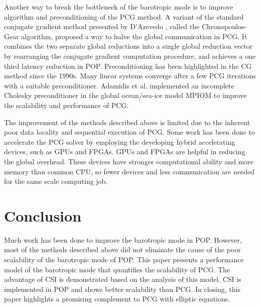\documentclass{sig-alternate}
\begin{document}
Another way to break the bottleneck of the barotropic mode is to improve algorithm and preconditioning of the PCG method.
A variant of the standard conjugate gradient method presented by D'Azevedo \cite{dAzevedo1999lapack}, called the Chronopoulos-Gear algorithm, proposed a way to halve the global communication in PCG.  It combines the two separate global reductions into a single global reduction vector by rearranging the conjugate gradient computation procedure, and achieves a one third latency reduction in POP. Preconditioning has been highlighted in the CG method since the 1990s. Many linear systems converge after a few PCG iterations with a suitable preconditioner.  Adamidis et al. \cite{adamidis2011high} implemented an incomplete Cholesky preconditioner in the global ocean/sea-ice model MPIOM to improve the scalability and performance of PCG.

The improvement of the methods described above is limited due to the inherent poor data locality and sequential execution of PCG. Some work has been done to accelerate the PCG solver by employing the developing hybrid  accelerating devices, such as GPUs\cite{cuomo2012pcg} and FPGAs\cite{Shida2007}.
GPUs and FPGAs are helpful in reducing the global overhead. These devices have stronger computational ability and more memory than common CPU, so fewer devices and less communication are needed for the same scale computing job.


\section{Conclusion} \label{se:conc}
Much work has been done to improve the barotropic mode in POP. However, most of the methods described above did not eliminate the cause of the poor scalability of the barotropic mode of POP. This paper presents a performance model of the barotropic mode that quantifies the scalability of PCG. The advantage of CSI is demonstrated based on the analysis of this model. CSI is implemented in POP and shows better scalability than PCG. In closing, this paper highlights a promising complement to PCG with elliptic equations.
\end{document}

